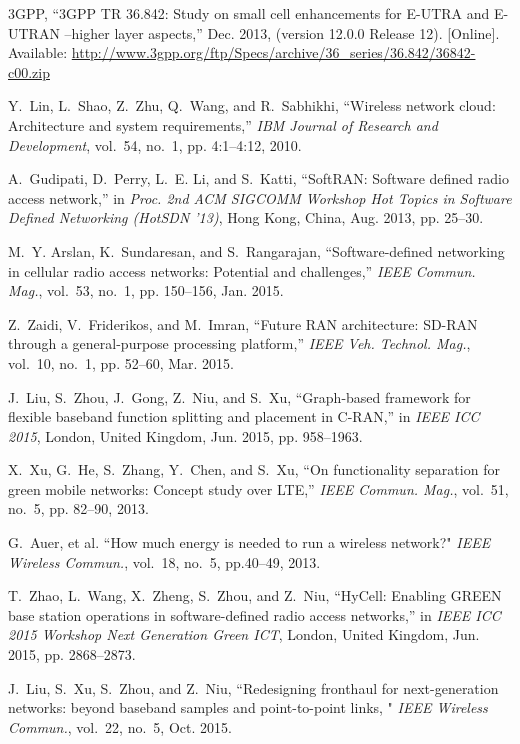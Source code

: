 \documentclass[12pt, draftclsnofoot,onecolumn]{IEEEtran}
\begin{document}
\begin{thebibliography}{99}
\BIBentryALTinterwordspacing
3GPP, ``{3GPP} {TR} 36.842: Study on small cell enhancements for {E-UTRA} and
  {E-UTRAN} --higher layer aspects,'' Dec. 2013, (version 12.0.0 Release 12).
  [Online]. Available:
  \url{http://www.3gpp.org/ftp/Specs/archive/36_series/36.842/36842-c00.zip}
\BIBentrySTDinterwordspacing

Y.~Lin, L.~Shao, Z.~Zhu, Q.~Wang, and R.~Sabhikhi, ``Wireless network cloud:
  Architecture and system requirements,'' \emph{IBM Journal of Research and
  Development}, vol.~54, no.~1, pp. 4:1--4:12, 2010.

A.~Gudipati, D.~Perry, L.~E. Li, and S.~Katti, ``{S}oft{RAN}: Software defined
  radio access network,'' in \emph{Proc. 2nd ACM SIGCOMM Workshop Hot Topics in
  Software Defined Networking (HotSDN '13)}, Hong Kong, China, Aug. 2013, pp.
  25--30.

M.~Y. Arslan, K.~Sundaresan, and S.~Rangarajan, ``Software-defined networking
  in cellular radio access networks: Potential and challenges,'' \emph{{IEEE}
  Commun. Mag.}, vol.~53, no.~1, pp. 150--156, Jan. 2015.

Z.~Zaidi, V.~Friderikos, and M.~Imran, ``Future {RAN} architecture: {SD-RAN}
  through a general-purpose processing platform,'' \emph{{IEEE} Veh. Technol.
  Mag.}, vol.~10, no.~1, pp. 52--60, Mar. 2015.

J.~Liu, S.~Zhou, J.~Gong, Z.~Niu, and S.~Xu, ``Graph-based framework for
  flexible baseband function splitting and placement in C-RAN,'' in \emph{IEEE
  ICC 2015}, London, United Kingdom, Jun. 2015, pp. 958--1963.

X.~Xu, G.~He, S.~Zhang, Y.~Chen, and S.~Xu, ``On functionality separation for
  green mobile networks: Concept study over {LTE},'' \emph{{IEEE} Commun.
  Mag.}, vol.~51, no.~5, pp. 82--90, 2013.

G.~Auer, et al. ``How much energy is needed to run a wireless
  network?" \emph{IEEE Wireless Commun.}, vol.~18, no.~5, pp.40--49, 2013.

T.~Zhao, L.~Wang, X.~Zheng, S.~Zhou, and Z.~Niu, ``{H}y{C}ell: Enabling {GREEN}
  base station operations in software-defined radio access networks,'' in
  \emph{IEEE ICC 2015 Workshop Next Generation Green ICT}, London, United
  Kingdom, Jun. 2015, pp. 2868--2873.

J.~Liu, S.~Xu, S.~Zhou, and Z.~Niu, ``Redesigning fronthaul for next-generation networks: beyond baseband samples and point-to-point links, " \emph{IEEE Wireless Commun.}, vol.~22, no.~5, Oct. 2015.

\end{thebibliography}
\end{document}
